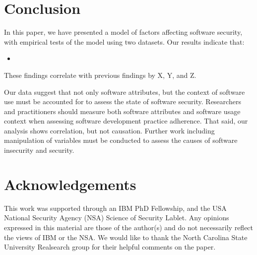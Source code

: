 \section{Conclusion}
\label{sec:conclusion}

In this paper, we have presented a model of factors affecting software security, with empirical tests of the model using two datasets. Our results indicate that:
\begin{itemize}
	\item
\end{itemize} 	
These findings correlate with previous findings by X, Y, and Z.

Our data suggest that not only software attributes, but the context of software use must be accounted for to assess the state of software security. Researchers and practitioners should measure both software attributes and software usage context when assessing software development practice adherence. That said, our analysis shows correlation, but not causation. Further work including manipulation of variables must be conducted to assess the causes of software insecurity and security. 

\section{Acknowledgements}

This work was supported through an IBM PhD Fellowship, and the USA National Security Agency (NSA) Science of Security Lablet. Any opinions expressed in this material are those of the author(s) and do not necessarily reflect the views of IBM or the NSA. We would like to thank the North Carolina State University Realsearch group for their helpful comments on the paper.




